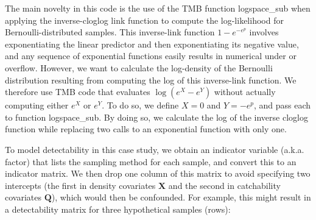 The main novelty in this code is the use of the TMB function \colorbox{backblue}{logspace\_sub} when applying the inverse-cloglog link function to compute the log-likelihood for Bernoulli-distributed samples.  This inverse-link function \(1-e^{-e^p}\) involves exponentiating the linear predictor and then exponentiating its negative value, and any sequence of exponential functions easily results in numerical under or overflow.  However, we want to calculate the log-density of the Bernoulli distribution resulting from computing the log of this inverse-link function.  We therefore use TMB code that evaluates \(\log(e^X-e^Y)\) without actually computing either \(e^X\) or \(e^Y\).  To do so, we define \(X=0\) and \(Y=-e^p\), and pass each to function \colorbox{backblue}{logspace\_sub}.  By doing so, we calculate the log of the inverse cloglog function while replacing two calls to an exponential function with only one. 

\lstset{style=TMBcode}

\label{code:Chap7_integrated_model}

To model detectability in this case study, we obtain an indicator variable (a.k.a. factor) that lists the sampling method for each sample, and convert this to an indicator matrix.  We then drop one column of this matrix to avoid specifying two intercepts (the first in density covariates \(\mathbf{X}\) and the second in catchability covariates \(\mathbf{Q}\)), which would then be confounded.  For example, this might result in a detectability matrix for three hypothetical samples (rows):

